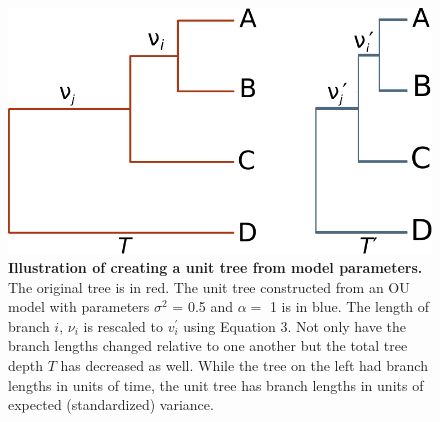 \documentclass[a4paper,12pt]{article}
\begin{document}
\begin{figure}[p]
  \centering
  \includegraphics{figs/unit-tree}
  \caption{\textbf{Illustration of creating a unit tree from model parameters.} The original tree is in red. The unit tree constructed from an OU model with parameters $\sigma^2$ = 0.5 and $\alpha=$ 1 is in blue. The length of branch $i$, $\nu_i$ is rescaled to $v_i^\prime$ using Equation 3. Not only have the branch lengths changed relative to one another but the total tree depth $T$ has decreased as well. While the tree on the left had branch lengths in units of time, the unit tree has branch lengths in units of expected (standardized) variance.}
  \label{fig:box1}
\end{figure}

\renewcommand\thefigure{S\arabic{figure}}
\renewcommand\thetable{S \arabic{table}}
\setcounter{figure}{0}    
\setcounter{table}{0}
\end{document}
